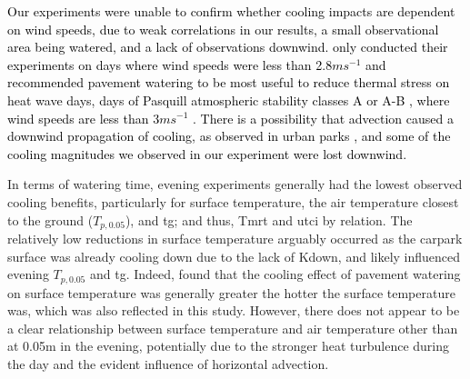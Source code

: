 \documentclass[final,3p,times,authoryear]{elsarticle}
\newcommand{\add}[1]{\textcolor{black}{#1}}
\newcommand{\remove}[1]{\textcolor{red}{\st{}}}
\begin{document}
\add{Our experiments were unable to confirm whether cooling impacts are dependent on wind speeds, due to weak correlations in our results, a small observational area being watered, and a lack of observations downwind. \cite{Hendel2015a} only conducted their experiments on days where wind speeds were less than 2.8$ms^{-1}$ and recommended pavement watering to be most useful to reduce thermal stress on heat wave days, days of Pasquill atmospheric stability classes A or A-B \citep{Pasquill1961}, where wind speeds are less than 3$ms^{-1}$ \citep{Hendel2016}. There is a possibility that advection caused a downwind propagation of cooling, as observed in urban parks \citep{Motazedian2020}, and some of the cooling magnitudes we observed in our experiment were lost downwind.}
\remove{Pavement watering's effectiveness at reducing air temperature has been found in previous research to be dependent on wind where lower wind speeds allow cooling to accumulate and propagate upwards. Hendel (2015a) recommends pavement watering activation conditions in Paris when wind speeds are less than 2.8ms-1. Our experiments were unable to confirm these results due to weak correlations in our results. There is a possibility that advection caused a downwind propagation of cooling, as observed in urban parks (Motazedian 2020), however given the small plot being watered and lack of observations downwind, this would need subsequent tests to prove.} 

In terms of watering time, evening experiments generally had the lowest observed cooling benefits, particularly for surface temperature, the air temperature closest to the ground ($T_{p,0.05}$), and \gls{tg}; and thus, \gls{Tmrt} and \gls{utci} by relation. The relatively low reductions in surface temperature arguably occurred as the carpark surface was already cooling down due to the lack of \gls{Kdown}, and likely influenced evening $T_{p,0.05}$ and \gls{tg}. Indeed, \cite{Takebayashi2021} found that the cooling effect of pavement watering on surface temperature was generally greater the hotter the surface temperature was, which was also reflected in this study. However, there does not appear to be a clear relationship between surface temperature and air temperature other than at 0.05m in the evening, potentially due to the stronger heat turbulence during the day and the evident influence of horizontal advection.
\end{document}
